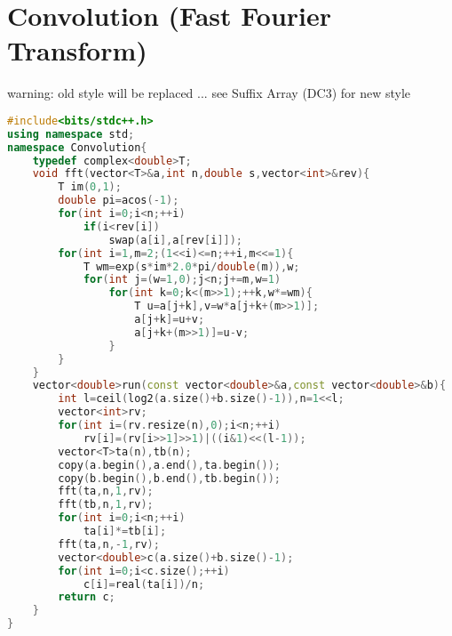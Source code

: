 \documentclass{book}
\begin{document}
\section{Convolution (Fast Fourier Transform)}
warning: old style will be replaced ... see Suffix Array (DC3) for new style\begin{lstlisting}[language=C++,title={Convolution (Fast Fourier Transform).hpp (1300 bytes, 39 lines)}]
#include<bits/stdc++.h>
using namespace std;
namespace Convolution{
    typedef complex<double>T;
    void fft(vector<T>&a,int n,double s,vector<int>&rev){
        T im(0,1);
        double pi=acos(-1);
        for(int i=0;i<n;++i)
            if(i<rev[i])
                swap(a[i],a[rev[i]]);
        for(int i=1,m=2;(1<<i)<=n;++i,m<<=1){
            T wm=exp(s*im*2.0*pi/double(m)),w;
            for(int j=(w=1,0);j<n;j+=m,w=1)
                for(int k=0;k<(m>>1);++k,w*=wm){
                    T u=a[j+k],v=w*a[j+k+(m>>1)];
                    a[j+k]=u+v;
                    a[j+k+(m>>1)]=u-v;
                }
        }
    }
    vector<double>run(const vector<double>&a,const vector<double>&b){
        int l=ceil(log2(a.size()+b.size()-1)),n=1<<l;
        vector<int>rv;
        for(int i=(rv.resize(n),0);i<n;++i)
            rv[i]=(rv[i>>1]>>1)|((i&1)<<(l-1));
        vector<T>ta(n),tb(n);
        copy(a.begin(),a.end(),ta.begin());
        copy(b.begin(),b.end(),tb.begin());
        fft(ta,n,1,rv);
        fft(tb,n,1,rv);
        for(int i=0;i<n;++i)
            ta[i]*=tb[i];
        fft(ta,n,-1,rv);
        vector<double>c(a.size()+b.size()-1);
        for(int i=0;i<c.size();++i)
            c[i]=real(ta[i])/n;
        return c;
    }
}
\end{lstlisting}
\end{document}
